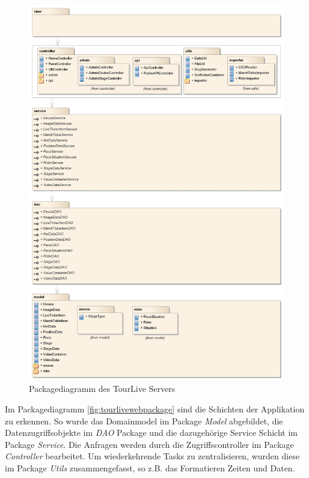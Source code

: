 \begin{figure}[H]
	\centering
	\includegraphics[width=130mm]{images/tourliveweb/TourLiveServer_Package_ohneRand.jpg}
	\caption{Packagediagramm des TourLive Servers}
\end{figure}\label{fig:tourlivewebpackage}

Im Packagediagramm \ref{fig:tourlivewebpackage} sind die Schichten der Applikation zu erkennen. So wurde das Domainmodel im Package \textit{Model} abgebildet, die Datenzugriffsobjekte im \textit{DAO} Package und die dazugehörige Service Schicht im Package \textit{Service}. Die Anfragen werden durch die Zugriffscontroller im Package \textit{Controller} bearbeitet. Um wiederkehrende Tasks zu zentralisieren, wurden diese im Package \textit{Utils} zusammengefasst, so z.B. das Formatieren Zeiten und Daten.

